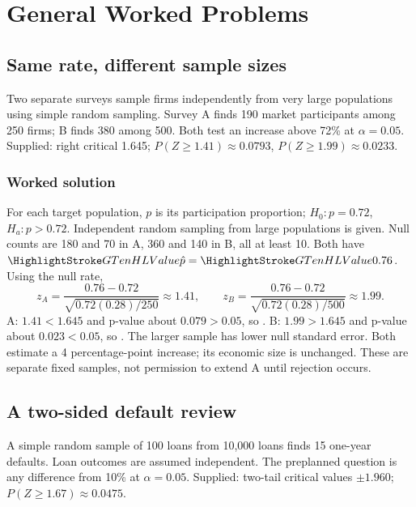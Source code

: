\section{General Worked Problems}\label{sec:general-worked}
\subsection{Same rate, different sample sizes}\label{prob:samples}
Two separate surveys sample firms independently from very large populations using simple random sampling. Survey A finds 190 market participants among 250 firms; B finds 380 among 500. Both test an increase above 72\% at $\alpha=0.05$. Supplied: right critical 1.645; $P(Z\ge1.41)\approx0.0793$, $P(Z\ge1.99)\approx0.0233$.
\subsubsection*{Worked solution}\label{sol:samples}
For each target population, $p$ is its participation proportion; $H_0:p=0.72$, $H_a:p>0.72$. Independent random sampling from large populations is given. Null counts are 180 and 70 in A, 360 and 140 in B, all at least 10. Both have $\Obs{\hat p}=\Obs{0.76}$. Using the null rate,
\[
z_A=\frac{0.76-0.72}{\sqrt{0.72(0.28)/250}}\approx1.41,\qquad
z_B=\frac{0.76-0.72}{\sqrt{0.72(0.28)/500}}\approx1.99.
\]
A: $1.41<1.645$ and p-value about $0.079>0.05$, so . B: $1.99>1.645$ and p-value about $0.023<0.05$, so . The larger sample has lower null standard error. Both estimate a 4 percentage-point increase; its economic size is unchanged. These are separate fixed samples, not permission to extend A until rejection occurs.
\subsection{A two-sided default review}\label{prob:default}
A simple random sample of 100 loans from 10,000 loans finds 15 one-year defaults. Loan outcomes are assumed independent. The preplanned question is any difference from 10\% at $\alpha=0.05$. Supplied: two-tail critical values $\pm1.960$; $P(Z\ge1.67)\approx0.0475$.

